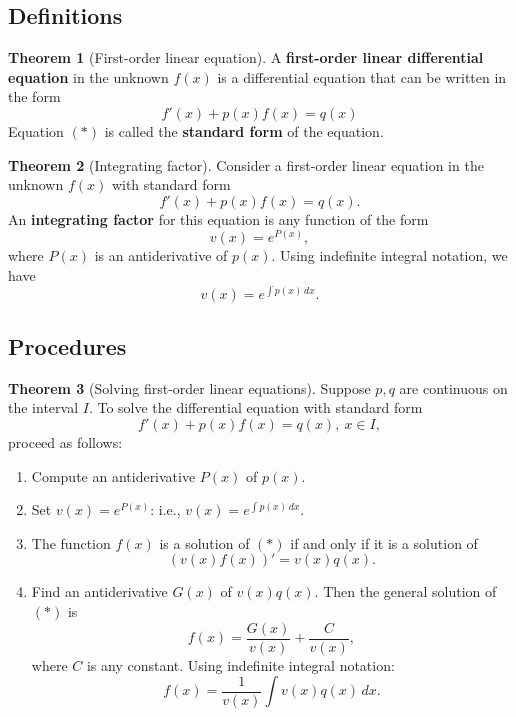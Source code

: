 \documentclass[11pt]{article}
\theoremstyle{definition}
\theoremstyle{named}
\newtheorem*{namedtheorem}{Theorem}
\numberwithin{myalgctr}{section}
\begin{document}
\thispagestyle{fancy}
\subsection*{Definitions}
\begin{namedtheorem}[First-order linear equation]A {\bf first-order linear differential equation} in the unknown $f(x)$ is a differential equation that can be written in the form
  \[
  f'(x)+p(x)f(x)=q(x) \tag{$*$}
  \]
Equation $(*)$ is called the {\bf standard form} of the equation.
\end{namedtheorem}
\begin{namedtheorem}[Integrating factor] Consider a first-order linear equation in the unknown $f(x)$ with standard form
  \[
  f'(x)+p(x)f(x)=q(x).
  \]
  An {\bf integrating factor} for this equation is any function of the form
  \[
  v(x)=e^{P(x)},
  \]
  where $P(x)$ is an antiderivative of $p(x)$. Using indefinite integral notation, we have
  \[
  v(x)=e^{\int p(x)\, dx}.
  \]
\end{namedtheorem}




\subsection*{Procedures}
\begin{namedtheorem}[Solving first-order linear equations] Suppose $p, q$ are continuous on the interval $I$. To solve the differential equation with standard form
  \[
  f'(x)+p(x)f(x)=q(x), \ x\in I, \tag{$*$}
  \]
 proceed as follows:
 \begin{enumerate}
   \item Compute an antiderivative $P(x)$ of $p(x)$.
   \item Set $v(x)=e^{P(x)}$: i.e., $v(x)=e^{\int p(x)\, dx}$.
   \item The function $f(x)$ is a solution of $(*)$ if and only if it is a solution of
   \[
   (v(x)f(x))'=v(x)q(x).
   \]
   \item Find an antiderivative $G(x)$ of $v(x)q(x)$. Then the general solution of $(*)$ is
   \[
   f(x)=\frac{G(x)}{v(x)}+\frac{C}{v(x)},
   \]
   where $C$ is any constant. Using indefinite integral notation:
   \[
   f(x)=\frac{1}{v(x)}\int v(x)q(x)\, dx.
   \]
 \end{enumerate}
\end{namedtheorem}
\end{document}
